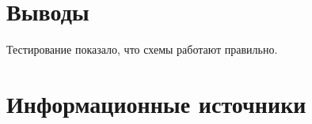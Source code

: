 \documentclass[14pt, a4paper]{extreport}
\begin{document}
\chapter{Выводы}
Тестирование показало, что схемы работают правильно.

\chapter{Информационные источники}
\end{document}
